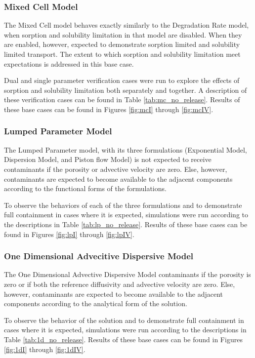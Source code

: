 \subsubsection{Mixed Cell Model}
The Mixed Cell model behaves exactly similarly to the Degradation Rate 
model, when sorption and solubility limitation in that model are disabled. When they are 
enabled, however, expected to demonstrate sorption limited and solubility 
limited transport. The extent to which sorption and solubility limitation meet 
expectations is addressed in this base case.

Dual and single parameter verification cases were run to explore the effects of sorption and 
solubility limitation both separately and together. A description of these verification 
cases can be found in Table \ref{tab:mc_no_release}. 
Results of these base cases can be found in Figures \ref{fig:mcI} through 
\ref{fig:mcIV}.



\clearpage

\subsubsection{Lumped Parameter Model}
The Lumped Parameter model, with its three formulations (Exponential Model, 
Dispersion Model, and Piston flow Model) is not expected to receive 
contaminants if the porosity or advective velocity are zero. Else, however, 
contaminants are expected to  become available to the adjacent components 
according to the functional forms of the formulations. 

To observe the behaviors of each of the three formulations and to demonstrate 
full containment in cases where it is expected, simulations were run
according to the descriptions in Table \ref{tab:lp_no_release}.
Results of these base cases can be found in Figures 
\ref{fig:lpI} through \ref{fig:lpIV}.



\clearpage

\subsubsection{One Dimensional Advecitive Dispersive Model}
The One Dimensional Advective Dispersive Model contaminants if the porosity is 
zero or if both the reference diffusivity and advective velocity are zero. 
Else, however, contaminants are expected to  become available to the adjacent 
components according to the analytical form of the solution.

To observe the behavior of the solution and to demonstrate full containment in 
cases where it is expected, simulations were run according to the descriptions 
in Table \ref{tab:1d_no_release}.  Results of these base cases can be found in 
Figures \ref{fig:1dI} through \ref{fig:1dIV}.  



\clearpage
